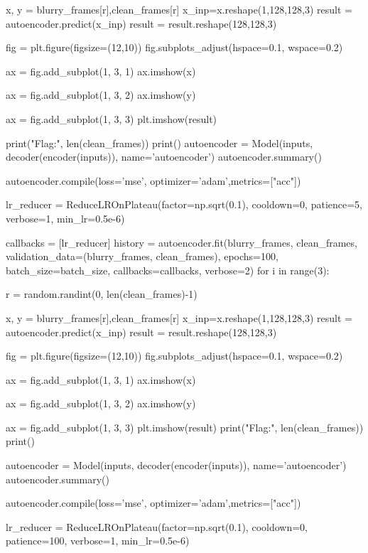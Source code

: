     x, y = blurry_frames[r],clean_frames[r]
    x_inp=x.reshape(1,128,128,3)
    result = autoencoder.predict(x_inp)
    result = result.reshape(128,128,3)

    fig = plt.figure(figsize=(12,10))
    fig.subplots_adjust(hspace=0.1, wspace=0.2)

    ax = fig.add_subplot(1, 3, 1)
    ax.imshow(x)

    ax = fig.add_subplot(1, 3, 2)
    ax.imshow(y)

    ax = fig.add_subplot(1, 3, 3)
    plt.imshow(result)
    
print("Flag:", len(clean_frames))
print()
autoencoder = Model(inputs, decoder(encoder(inputs)), name='autoencoder')
autoencoder.summary()

autoencoder.compile(loss='mse', optimizer='adam',metrics=["acc"])

lr_reducer = ReduceLROnPlateau(factor=np.sqrt(0.1),
                               cooldown=0,
                               patience=5,
                               verbose=1,
                               min_lr=0.5e-6)

callbacks = [lr_reducer]
history = autoencoder.fit(blurry_frames,
                      clean_frames,
                      validation_data=(blurry_frames, clean_frames),
                      epochs=100,
                      batch_size=batch_size,
                      callbacks=callbacks,
                      verbose=2)
for i in range(3):

    r = random.randint(0, len(clean_frames)-1)

    x, y = blurry_frames[r],clean_frames[r]
    x_inp=x.reshape(1,128,128,3)
    result = autoencoder.predict(x_inp)
    result = result.reshape(128,128,3)

    fig = plt.figure(figsize=(12,10))
    fig.subplots_adjust(hspace=0.1, wspace=0.2)

    ax = fig.add_subplot(1, 3, 1)
    ax.imshow(x)

    ax = fig.add_subplot(1, 3, 2)
    ax.imshow(y)

    ax = fig.add_subplot(1, 3, 3)
    plt.imshow(result)
print("Flag:", len(clean_frames))
print()

autoencoder = Model(inputs, decoder(encoder(inputs)), name='autoencoder')
autoencoder.summary()

autoencoder.compile(loss='mse', optimizer='adam',metrics=["acc"])

lr_reducer = ReduceLROnPlateau(factor=np.sqrt(0.1),
                               cooldown=0,
                               patience=100,
                               verbose=1,
                               min_lr=0.5e-6)

